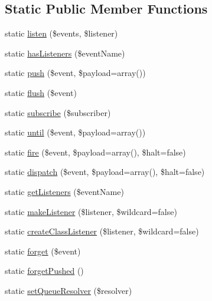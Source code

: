\subsection*{Static Public Member Functions}
\begin{DoxyCompactItemize}
\item 
static \mbox{\hyperlink{class_illuminate_1_1_support_1_1_facades_1_1_event_af6c77b8d45f8a0388c29f575bfec20db}{listen}} (\$events, \$listener)
\item 
static \mbox{\hyperlink{class_illuminate_1_1_support_1_1_facades_1_1_event_af1445f8e4da4a24d97aec517d82923b9}{has\+Listeners}} (\$event\+Name)
\item 
static \mbox{\hyperlink{class_illuminate_1_1_support_1_1_facades_1_1_event_a92bcef26cffc44eaa728d5a42213b43c}{push}} (\$event, \$payload=array())
\item 
static \mbox{\hyperlink{class_illuminate_1_1_support_1_1_facades_1_1_event_ae092ef357ca1cb0e7acca1407529f94c}{flush}} (\$event)
\item 
static \mbox{\hyperlink{class_illuminate_1_1_support_1_1_facades_1_1_event_afe5054be218b0935bdf84281f57a8910}{subscribe}} (\$subscriber)
\item 
static \mbox{\hyperlink{class_illuminate_1_1_support_1_1_facades_1_1_event_aa040042f059fbe08c9b936276c70f9cc}{until}} (\$event, \$payload=array())
\item 
static \mbox{\hyperlink{class_illuminate_1_1_support_1_1_facades_1_1_event_a44e799906c5fc88d04fb7859d6a42641}{fire}} (\$event, \$payload=array(), \$halt=false)
\item 
static \mbox{\hyperlink{class_illuminate_1_1_support_1_1_facades_1_1_event_a8807dbfc639e38325c8efbc58bcf97cc}{dispatch}} (\$event, \$payload=array(), \$halt=false)
\item 
static \mbox{\hyperlink{class_illuminate_1_1_support_1_1_facades_1_1_event_a03cc35afaa8327ba99604171c312198e}{get\+Listeners}} (\$event\+Name)
\item 
static \mbox{\hyperlink{class_illuminate_1_1_support_1_1_facades_1_1_event_a6264ee9533ccc8443b4a892979ad1211}{make\+Listener}} (\$listener, \$wildcard=false)
\item 
static \mbox{\hyperlink{class_illuminate_1_1_support_1_1_facades_1_1_event_a1339e5e820a8d509e50d6787fb145c54}{create\+Class\+Listener}} (\$listener, \$wildcard=false)
\item 
static \mbox{\hyperlink{class_illuminate_1_1_support_1_1_facades_1_1_event_a34e852aad1b68390255dcdb664fcdf13}{forget}} (\$event)
\item 
static \mbox{\hyperlink{class_illuminate_1_1_support_1_1_facades_1_1_event_ad1e8988ddbc72a930b91bb9e30b15c6e}{forget\+Pushed}} ()
\item 
static \mbox{\hyperlink{class_illuminate_1_1_support_1_1_facades_1_1_event_af335a488b7fd410572a91b3e60efde50}{set\+Queue\+Resolver}} (\$resolver)
\end{DoxyCompactItemize}


